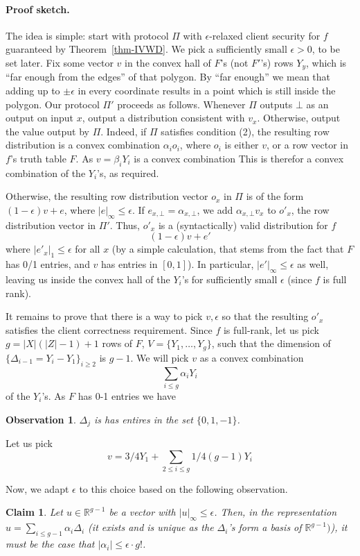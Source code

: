 \documentclass[a4paper]{article}
\newtheorem{claim}[theorem]{Claim}
\newtheorem{observation}{Observation}
\newcommand{\R}{\mathbb{R}}
\begin{document}
\paragraph{Proof sketch.}

The idea is simple: start with protocol $\Pi$ with  $\epsilon$-relaxed client security for $f$ guaranteed by Theorem~\ref{thm-IVWD}. We pick a sufficiently small $\epsilon>0$, to be set later. Fix some vector $v$ in the convex hall of $F$'s (not $F'$'s) rows $Y_y$, which is ``far enough from the edges'' of that polygon.
By ``far enough'' we mean that adding up to $\pm\epsilon$ in every coordinate
results in a point which is still inside the polygon.
Our protocol $\Pi'$ proceeds as follows. Whenever $\Pi$ outputs $\bot$ as an output on input $x$, output  a distribution consistent with $v_x$. Otherwise, output the value output by $\Pi$. 
Indeed, if $\Pi$ satisfies condition (2), the resulting row distribution is a convex combination $\alpha_i o_i$, where $o_i$ is either $v$, or a row vector in $f$'s truth table $F$. As $v = \beta_i Y_i$ is a convex combination 
This is therefor a convex combination of the $Y_i$'s, as required.

Otherwise, the resulting row distribution vector $o_x$ in $\Pi$ is of the form $(1-\epsilon)v+e$, where $|e|_\infty\leq \epsilon$. 
If $e_{x,\bot}=\alpha_{x,\bot}$, we add $\alpha_{x,\bot}v_x$ to $o'_x$,
the row distribution vector in $\Pi'$.
Thus, $o'_x$ is a (syntactically) valid distribution for $f$ \[(1-\epsilon)v+e'\] where $|e'_x|_1\leq \epsilon$ for all $x$ (by a simple calculation, that stems from the fact that $F$ has 0/1 entries, and $v$ has entries in $[0,1]$). In particular, $|e'|_\infty\leq \epsilon$ as well, leaving us inside the convex hall of the $Y_i$'s for sufficiently small $\epsilon$ (since $f$ is full rank). 

It remains to prove that there is a way to pick $v,\epsilon$ 
so that the resulting $o'_x$ satisfies the client correctness requirement.
Since $f$ is full-rank, let us pick $g=|X|(|Z|-1)+1$ rows of $F$, $V = \{Y_1,\ldots,Y_g\}$, such that the dimension of $\{\Delta_{i-1} = Y_i - Y_1\}_{i\geq 2}$ is $g-1$. We will pick $v$ as a convex combination
\[\sum_{i\leq g}\alpha_iY_i\]
of the $Y_i$'s.
As $F$ has 0-1 entries we have 
\begin{observation}\label{obs-1}
$\Delta_j$ is has entires in the set $\{0,1,-1\}$.
\end{observation}
Let us pick
\[v = 3/4Y_1 + \sum_{2\leq i\leq g}1/4(g-1) Y_i\]

Now, we adapt $\epsilon$ to this choice based on the following observation.
\begin{claim}\label{clm-proj}
Let $u\in \R^{g-1}$ be a vector with $|u|_\infty \leq \epsilon$. 
Then, in the representation $u = \sum_{i\leq g-1}\alpha_i\Delta_i$
(it exists and is unique as the $\Delta_i$'s form a basis of $\R^{g-1})$),
it must be the case that $|\alpha_i|\leq \epsilon \cdot g!$.  
\end{claim}
\end{document}
